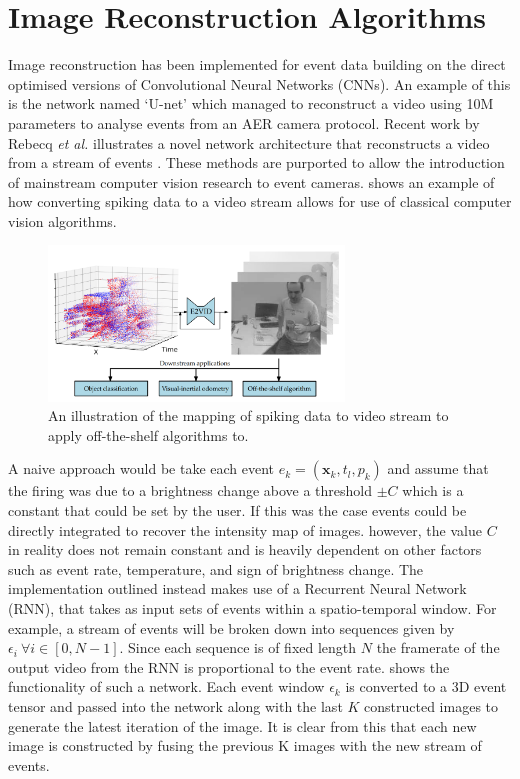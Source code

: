 \section{Image Reconstruction Algorithms} \label{ssec:image_reconstruction}

Image reconstruction has been implemented for event data building on the direct optimised versions of Convolutional Neural Networks (CNNs). An example of this is the network named `U-net'\cite{UNET} which managed to reconstruct a video using 10M parameters to analyse events from an AER camera protocol. Recent work by Rebecq \textit{et al.} illustrates a novel network architecture that reconstructs a video from a stream of events \cite{spikingToVideo}. These methods are purported to allow the introduction of mainstream computer vision research to event cameras.  shows an example of how converting spiking data to a video stream allows for use of classical computer vision algorithms.

\begin{figure}[htb]
      \centering
      \includegraphics[width=0.7\textwidth]{background/images/spikes_to_video.png}
      \caption{An illustration of the mapping of spiking data to video stream to apply off-the-shelf algorithms to\cite{spikingToVideo}.}
      \label{fig:spikes_to_video}
\end{figure}

A naive approach would be take each event $ e_k = (\boldsymbol{\mathbf{x}}_k, t_l, p_k ) $ and assume that the firing was due to a brightness change above a threshold $ \pm C $ which is a constant that could be set by the user. If this was the case events could be directly integrated to recover the intensity map of images. however, the value $ C $ in reality does not remain constant and is heavily dependent on other factors such as event rate, temperature, and sign of brightness change. The implementation outlined instead makes use of a Recurrent Neural Network (RNN), that takes as input sets of events within a spatio-temporal window. For example, a stream of events will be broken down into sequences given by $ \epsilon_i \: \forall i \in [0, N-1] $. Since each sequence is of fixed length $ N $ the framerate of the output video from the RNN is proportional to the event rate.  shows the functionality of such a network. Each event window $ \epsilon_k $ is converted to a 3D event tensor and passed into the network along with the last $ K $ constructed images to generate the latest iteration of the image. It is clear from this that each new image is constructed by fusing the previous K images with the new stream of events.

